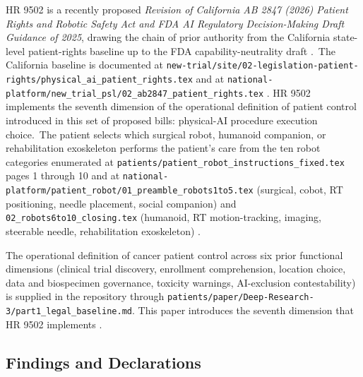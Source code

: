 
\hspace{0.5cm} HR 9502 is a recently proposed \textit{Revision of California AB 2847 (2026) Patient
Rights and Robotic Safety Act and FDA AI Regulatory Decision-Making
Draft Guidance of 2025}, drawing the chain of prior authority from
the California state-level patient-rights baseline up to the FDA
capability-neutrality draft \cite{fda_ai_regulatory_decision_draft_2025}.\
The California baseline is documented at
\texttt{new-trial/site/02-legislation-patient-rights/physical\_ai\_patient\_rights.tex}
and at
\texttt{national-platform/new\_trial\_psl/02\_ab2847\_patient\_rights.tex}
\cite{kawchak_2026_19176370, kawchak_2026_19244918}. HR 9502 implements
the seventh dimension of the operational definition of patient
control introduced in this set of proposed bills: physical-AI procedure execution
choice.\ The patient selects which surgical robot, humanoid companion,
or rehabilitation exoskeleton performs the patient's care from the
ten robot categories enumerated at
\texttt{patients/patient\_robot\_instructions\_fixed.tex} pages 1
through 10 and at
\texttt{national-platform/patient\_robot/01\_preamble\_robots1to5.tex}
(surgical, cobot, RT positioning, needle placement, social companion)
and \texttt{02\_robots6to10\_closing.tex} (humanoid, RT motion-tracking, imaging, steerable needle, rehabilitation exoskeleton)
\cite{kawchak_2026_18810541, kawchak_2026_18778219,
target2025robotic_bronchoscopy}.

The operational definition of cancer patient control across six prior
functional dimensions (clinical trial discovery, enrollment comprehension,
location choice, data and biospecimen governance, toxicity warnings,
AI-exclusion contestability) is supplied in the repository through
\texttt{patients/paper/Deep-Research-3/part1\_legal\_baseline.md}.
This paper introduces the seventh dimension that HR 9502 implements
\cite{hhs_45cfr46_protection_human_subjects,
fda_informed_consent_guidance_2023, fda_dct_guidance_2024}.

\subsection{Findings and Declarations}

